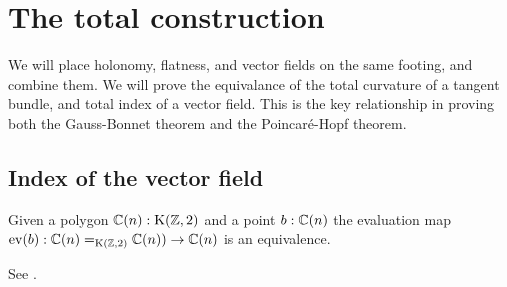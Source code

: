 \section{The total construction}
\label{sec:totals}
We will place holonomy, flatness, and vector fields on the same footing, and combine them. We will prove the equivalance of the total curvature of a tangent bundle, and total index of a vector field. This is the key relationship in proving both the Gauss-Bonnet theorem and the Poincaré-Hopf theorem.

\subsection{Index of the vector field}
\begin{myprop}
\label{prop:eveq}
Given a polygon \( \mathbb{C}(n):\mathrm{K}(\mathbb{Z},2) \) and a point \( b:\mathbb{C}(n) \) the evaluation map \( \mathrm{ev}(b):\mathbb{C}(n)=_{\mathrm{K}(\mathbb{Z},2)}\mathbb{C}(n))\to \mathbb{C}(n) \) is an equivalence.
\end{myprop}
\begin{myproof}
See \cite{buchholtz2023central}.
\end{myproof}

